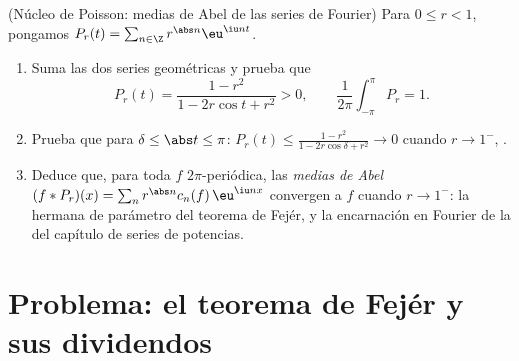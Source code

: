 \begin{exercise}[$\star\star\star$]\label{exo:b2:fourier:12}
(Núcleo de Poisson: medias de Abel de las series de Fourier) Para $0
\leq r < 1$, pongamos $P_r(t) = \sum_{n\in\Z} r^{\abs n}\eu^{\iu
nt}$.
\begin{enumerate}
  \item Suma las dos series geométricas y prueba que
        \[
        P_r(t) = \frac{1 - r^2}{1 - 2r\cos t + r^2} > 0,
        \qquad
        \frac{1}{2\pi}\int_{-\pi}^{\pi}P_r = 1 .
        \]
  \item Prueba que para $\delta \leq \abs t \leq \pi$: $P_r(t) \leq
        \frac{1 - r^2}{1 - 2r\cos\delta + r^2} \to 0$ cuando $r \to
        1^-$, .
  \item Deduce que, para toda $f$  $2\pi$-periódica, las
        \emph{medias de Abel} $(f * P_r)(x) = \sum_n r^{\abs
        n}c_n(f)\,\eu^{\iu nx}$ convergen a $f$ 
        cuando $r \to 1^-$: la hermana de parámetro  del
        teorema de Fejér, y la encarnación en Fourier de la
         del capítulo de series de potencias.
\end{enumerate}
\end{exercise}

\section{Problema: el teorema de Fejér y sus dividendos}

